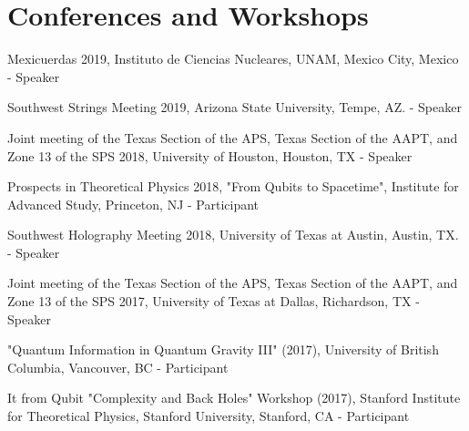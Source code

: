 \documentclass[letterpaper]{article}
\renewenvironment{itemize}{
  \begin{list}{}{
    \setlength{\leftmargin}{1.5em}
  }
}{
  \end{list}
}
\begin{document}
\section*{Conferences and Workshops}
\begin{itemize}

\item Mexicuerdas 2019, Instituto de Ciencias Nucleares, UNAM, Mexico City, Mexico - Speaker

\item Southwest Strings Meeting 2019, Arizona State University, Tempe, AZ. - Speaker

\item Joint meeting of the Texas Section of the APS, Texas Section of the AAPT, and Zone 13 of the SPS 2018, University of Houston, Houston, TX - Speaker

\item Prospects in Theoretical Physics 2018, "From Qubits to Spacetime", Institute for Advanced Study, Princeton, NJ - Participant

\item Southwest Holography Meeting 2018, University of Texas at Austin, Austin, TX. - Speaker

\item Joint meeting of the Texas Section of the APS, Texas Section of the AAPT, and Zone 13 of the SPS 2017, University of Texas at Dallas, Richardson, TX - Speaker

\item "Quantum Information in Quantum Gravity III" (2017), University of British Columbia, Vancouver, BC - Participant

\item It from Qubit "Complexity and Back Holes" Workshop (2017), Stanford Institute for Theoretical Physics, Stanford University, Stanford, CA - Participant

\end{itemize}
\end{document}
